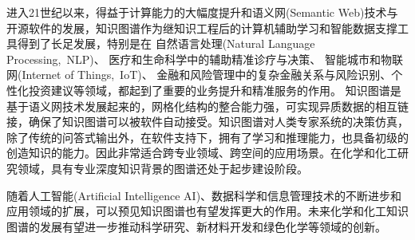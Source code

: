 进入21世纪以来，得益于计算能力的大幅度提升和语义网\textrm{(Semantic Web)}技术与开源软件的发展，知识图谱作为继知识工程后的计算机辅助学习和智能数据支撑工具得到了长足发展，特别是在%
自然语言处理\textrm{(Natural Language Processing,~NLP)}、%
医疗和生命科学中的辅助精准诊疗与决策、%
智能城市和物联网\textrm{(Internet of Things,~IoT)}、%
金融和风险管理中的复杂金融关系与风险识别、个性化投资建议等领域，都起到了重要的业务提升和精准服务的作用。%
知识图谱是基于语义网技术发展起来的，网格化结构的整合能力强，可实现异质数据的相互链接，确保了知识图谱可以被软件自动接受。知识图谱对人类专家系统的决策仿真，除了传统的问答式输出外，在软件支持下，拥有了学习和推理能力，也具备初级的创造知识的能力。因此非常适合跨专业领域、跨空间的应用场景。在化学和化工研究领域，具有专业深度知识背景的图谱还处于起步建设阶段。%

随着人工智能\textrm{(Artificial Intelligence AI)}、数据科学和信息管理技术的不断进步和应用领域的扩展，可以预见知识图谱也有望发挥更大的作用。未来化学和化工知识图谱的发展有望进一步推动科学研究、新材料开发和绿色化学等领域的创新。

